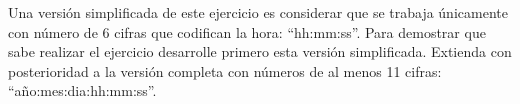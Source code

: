 Una versión simplificada de este ejercicio es considerar que se trabaja únicamente con número de 6 cifras que codifican la hora: ``hh:mm:ss''.  Para demostrar que sabe realizar el ejercicio desarrolle primero esta versión simplificada. Extienda con posterioridad a la versión completa con números de al menos 11 cifras: ``año:mes:dia:hh:mm:ss''.








%
%
%
%



\separacion